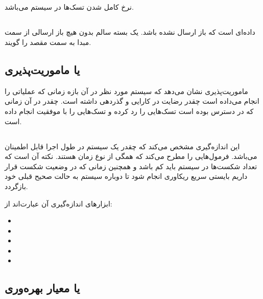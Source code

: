 \subsection{}

نرخ کامل شدن تسک‌ها در سیستم می‌باشد.

\subsection{}

داده‌ای است که باز ارسال نشده باشد. یک بسته سالم بدون هیچ باز ارسالی از سمت مبدا
به سمت مقصد را گویند.

\subsection{ یا ماموریت‌پذیری}

ماموریت‌پذیری نشان می‌دهد که سیستم مورد نظر در آن بازه زمانی که عملیاتی را انجام
می‌داده است چقدر رضایت در کارایی و گذردهی داشته است. چقدر در آن زمانی که در
دسترس بوده است تسک‌هایی را رد کرده و تسک‌هایی را با موفقیت انجام داده است.

\subsection{}

این اندازه‌گیری مشخص می‌کند که چقدر یک سیستم در طول اجرا قابل اطمینان می‌باشد.
فرمول‌هایی را مطرح می‌کند که همگی از نوع زمان هستند. نکته آن است که تعداد
شکست‌ها در سیستم باید کم باشد و همچنین زمانی که در وضعیت شکست قرار داریم بایستی
سریع ریکاوری انجام شود تا دوباره سیستم به حالت صحیح قبلی خود بازگردد.

ابزار‌های اندازه‌گیری آن عبارت‌اند از:

\begin{itemize}
    \item {}
    \item {}
    \item {}
    \item {}
    \item {}
\end{itemize}

\subsection{ یا معیار بهره‌وری}

